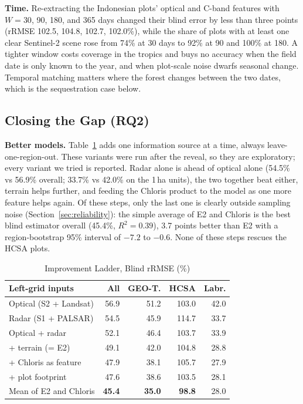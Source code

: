 \documentclass[conference,a4paper]{IEEEtran}
\begin{document}
\textbf{Time.} Re-extracting the Indonesian plots' optical and C-band features with $W=30$, 90, 180, and 365 days changed their blind error by less than three points (rRMSE 102.5, 104.8, 102.7, 102.0\%), while the share of plots with at least one clear Sentinel-2 scene rose from 74\% at 30 days to 92\% at 90 and 100\% at 180. A tighter window costs coverage in the tropics and buys no accuracy when the field date is only known to the year, and when plot-scale noise dwarfs seasonal change. Temporal matching matters where the forest changes between the two dates, which is the sequestration case below.

\subsection{Closing the Gap (RQ2)}
\textbf{Better models.} Table~\ref{tab:ladder} adds one information source at a time, always leave-one-region-out. These variants were run after the reveal, so they are exploratory; every variant we tried is reported. Radar alone is ahead of optical alone (54.5\% vs 56.9\% overall; 33.7\% vs 42.0\% on the 1\,ha units), the two together beat either, terrain helps further, and feeding the Chloris product to the model as one more feature helps again. Of these steps, only the last one is clearly outside sampling noise (Section~\ref{sec:reliability}): the simple average of E2 and Chloris is the best blind estimator overall (45.4\%, $R^2=0.39$), 3.7 points better than E2 with a region-bootstrap 95\% interval of $-7.2$ to $-0.6$. None of these steps rescues the HCSA plots.

\begin{table}[t]
\centering
\caption{Improvement Ladder, Blind rRMSE (\%)}
\label{tab:ladder}
\footnotesize
\setlength{\tabcolsep}{3.5pt}
\begin{tabular}{@{}l r r r r@{}}
\toprule
\textbf{Left-grid inputs} & \textbf{All} & \textbf{GEO-T.} & \textbf{HCSA} & \textbf{Labr.}\\
\midrule
Optical (S2 + Landsat) & 56.9 & 51.2 & 103.0 & 42.0\\
Radar (S1 + PALSAR) & 54.5 & 45.9 & 114.7 & 33.7\\
Optical + radar & 52.1 & 46.4 & 103.7 & 33.9\\
\quad + terrain (= E2) & 49.1 & 42.0 & 104.8 & 28.8\\
\quad + Chloris as feature & 47.9 & 38.1 & 105.7 & 27.9\\
\quad + plot footprint & 47.6 & 38.6 & 103.5 & 28.1\\
Mean of E2 and Chloris & \textbf{45.4} & \textbf{35.0} & \textbf{98.8} & 28.0\\
\bottomrule
\end{tabular}
\end{table}
\end{document}
